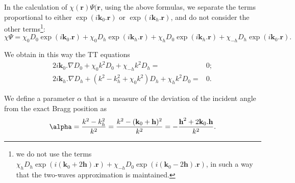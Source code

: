 \documentclass[preprint]{iucr}              %
\newcommand{\inred}[1]{{\color{red}#1}}
\begin{document}
In the calculation of $\chi(\textbf{r}) \Psi(\textbf{r}$, using the above formulas, we separate the terms proportional to either $\exp(i \textbf{k}_0 . \textbf{r})$ or $\exp(i \textbf{k}_h . \textbf{r})$, and do not consider the other terms\footnote{
\inred{we do not use the terms $\chi_h D_h \exp(i (\textbf{k}_0+2\textbf{h}) . \textbf{r}) + \chi_{-h} D_0 \exp(i (\textbf{k}_0 - 2 \textbf{h}) .\textbf{r})$},
in such a way that the two-waves approximation is maintained. 
}:
\begin{equation}
\label{eq:approxchiPsi}
\chi\Psi =
\chi_0 D_0 \exp(i \textbf{k}_0 . \textbf{r}) +
\chi_0 D_h \exp(i \textbf{k}_h . \textbf{r}) +
\chi_h D_0 \exp(i \textbf{k}_h . \textbf{r}) +
\chi_{-h} D_h \exp(i \textbf{k}_0 . \textbf{r}). \nonumber
\end{equation}

We obtain in this way the TT equations 
\begin{subequations}
\label{eq:TTvector}
\begin{align}
2 i \textbf{k}_0 . \nabla D_0 + \chi_0 k^2 D_0 + \chi_{-h} k^2 D_h =& 0; \\
2 i \textbf{k}_h . \nabla D_h + (k^2 - k_h^2 + \chi_0 k^2) D_h + \chi_{h} k^2 D_0 =& 0.
\end{align}
\end{subequations}

We define a parameter $\alpha$ that is a measure of the deviation
of the incident angle from the exact Bragg position as
\begin{equation}
\label{eq:alpha}
\alpha = \frac{k^2-k_h^2}{k^2} = \frac{k^2-(\textbf k_0 + \textbf h)^2}{k^2} = - \frac{\textbf h^2 + 2 \textbf k_0 . \textbf h}{k^2}.
\end{equation}
\end{document}
